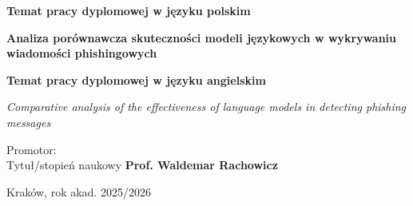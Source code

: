 \begin{titlepage}
\begin{center}
{\large\bfseries Temat pracy dyplomowej w języku polskim} \\
\vspace{0.35cm}

{\fontsize{16pt}{18pt}\selectfont\bfseries Analiza porównawcza skuteczności modeli językowych w wykrywaniu wiadomości phishingowych}

\vspace{0.6cm}
{\large\bfseries Temat pracy dyplomowej w języku angielskim}

\vspace{0.35cm}
{\fontsize{15pt}{17pt}\selectfont\itshape Comparative analysis of the effectiveness of language models in detecting phishing messages}

\end{center}

\vspace{2cm}


\begin{center}
\large Promotor: \\ Tytuł/stopień naukowy \textbf{Prof. Waldemar Rachowicz}
\end{center}

\vspace{1cm}

\begin{center}
\Large Kraków, rok akad. 2025/2026
\end{center}
\end{titlepage}

